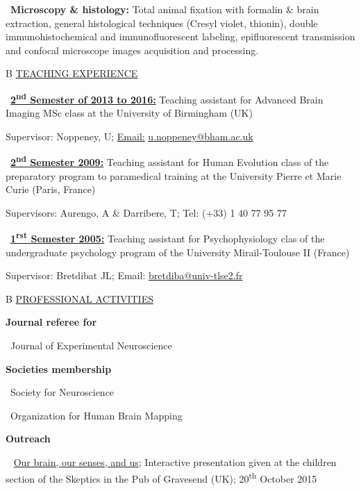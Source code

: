 \documentclass[a4paper,12pt,oneside]{letter}
\begin{document}
{\textbullet~\textbf{Microscopy \& histology:} Total animal fixation with formalin \& brain extraction, general histological techniques (Cresyl violet, thionin), double immunohistochemical and immunofluorescent labeling, epifluorescent transmission and confocal microscope images acquisition and processing.



\medskip 

\begin{tabular}{B}
\underline{TEACHING EXPERIENCE}
\end{tabular}

\textbullet~\underline{\textbf{2\textsuperscript{nd} Semester of 2013 to 2016:}} 	Teaching assistant for Advanced Brain Imaging MSc class at the University of Birmingham (UK)

Supervisor: Noppeney, U; \underline{Email:} \href{mailto:u.noppeney@bham.ac.uk}{u.noppeney@bham.ac.uk}

\textbullet~\underline{\textbf{2\textsuperscript{nd} Semester 2009:}} 	Teaching assistant for Human Evolution class of the preparatory program to paramedical training at the University Pierre et Marie Curie (Paris, France)

Supervisors: Aurengo, A \& Darribere, T; Tel: (+33) 1 40 77 95 77

\textbullet~\underline{\textbf{1\textsuperscript{rst} Semester 2005:}} 	Teaching assistant for Psychophysiology clas of the undergraduate psychology program of the University Mirail-Toulouse II (France)

Supervisor: Bretdibat JL; Email: \href{mailto:bretdiba@univ-tlse2.fr}{bretdiba@univ-tlse2.fr}



\medskip 

\begin{tabular}{B}
\underline{PROFESSIONAL ACTIVITIES}
\end{tabular}


\textbf{Journal referee for}

\textbullet~Journal of Experimental Neuroscience


\textbf{Societies membership}

\textbullet~Society for Neuroscience

\textbullet~Organization for Human Brain Mapping


\textbf{Outreach}

\textbullet~ \href{https://dx.doi.org/10.6084/m9.figshare.4535423.v1}{Our brain, our senses, and us}; Interactive presentation given at the children section of the Skeptics in the Pub of Gravesend (UK); 20\textsuperscript{th} October 2015


}
\end{document}
